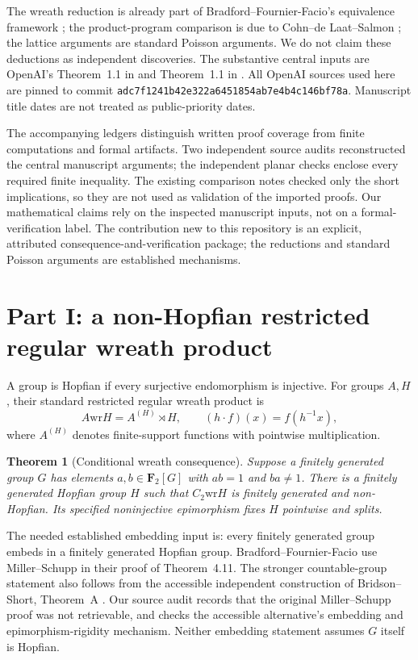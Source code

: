 \documentclass[11pt]{article}
\newtheorem{theorem}{Theorem}
\newcommand{\F}{\mathbf F}
\newcommand{\wrp}{\mathbin{\mathrm{wr}}}
\begin{document}
The wreath reduction is already part of Bradford--Fournier-Facio's equivalence framework \cite{bff}; the product-program comparison is due to Cohn--de Laat--Salmon \cite{cdls}; the lattice arguments are standard Poisson arguments. We do not claim these deductions as independent discoveries. The substantive central inputs are OpenAI's Theorem~1.1 in \cite{oai197} and Theorem~1.1 in \cite{oai090}. All OpenAI sources used here are pinned to commit \nolinkurl{adc7f1241b42e322a6451854ab7e4b4c146bf78a}. Manuscript title dates are not treated as public-priority dates.

The accompanying ledgers distinguish written proof coverage from finite computations and formal artifacts. Two independent source audits reconstructed the central manuscript arguments; the independent planar checks enclose every required finite inequality. The existing comparison notes checked only the short implications, so they are not used as validation of the imported proofs. Our mathematical claims rely on the inspected manuscript inputs, not on a formal-verification label. The contribution new to this repository is an explicit, attributed consequence-and-verification package; the reductions and standard Poisson arguments are established mechanisms.

\section{Part I: a non-Hopfian restricted regular wreath product}
A group is Hopfian if every surjective endomorphism is injective. For groups $A,H$, their standard restricted regular wreath product is
\[
 A\wrp H=A^{(H)}\rtimes H,\qquad
 (h\cdot f)(x)=f(h^{-1}x),
\]
where $A^{(H)}$ denotes finite-support functions with pointwise multiplication.

\begin{theorem}[Conditional wreath consequence]\label{thm:wreath}
Suppose a finitely generated group $G$ has elements $a,b\in\F_2[G]$ with $ab=1$ and $ba\ne1$. There is a finitely generated Hopfian group $H$ such that $C_2\wrp H$ is finitely generated and non-Hopfian. Its specified noninjective epimorphism fixes $H$ pointwise and splits.
\end{theorem}

The needed established embedding input is: every finitely generated group embeds in a finitely generated Hopfian group. Bradford--Fournier-Facio use Miller--Schupp \cite{ms} in their proof of Theorem~4.11. The stronger countable-group statement also follows from the accessible independent construction of Bridson--Short, Theorem~A \cite{bs}. Our source audit records that the original Miller--Schupp proof was not retrievable, and checks the accessible alternative's embedding and epimorphism-rigidity mechanism. Neither embedding statement assumes $G$ itself is Hopfian.
\end{document}

